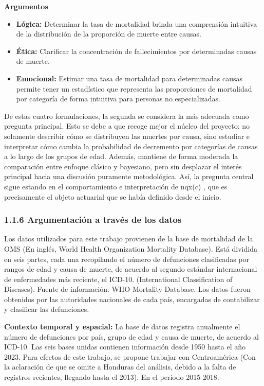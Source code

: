 \documentclass[
  letterpaper,
  DIV=11,
  numbers=noendperiod]{scrartcl}
\begin{document}
\textbf{Argumentos}

\begin{itemize}
\item
  \textbf{Lógica:} Determinar la tasa de mortalidad brinda una
  comprensión intuitiva de la distribución de la proporción de muerte
  entre causas.
\item
  \textbf{Ética:} Clarificar la concentración de fallecimientos por
  determinadas causas de muerte.
\item
  \textbf{Emocional:} Estimar una tasa de mortalidad para determinadas
  causas permite tener un estadístico que representa las proporciones de
  mortalidad por categoría de forma intuitiva para personas no
  especializadas.
\end{itemize}

De estas cuatro formulaciones, la segunda se considera la más adecuada
como pregunta principal. Esto se debe a que recoge mejor el núcleo del
proyecto: no solamente describir cómo se distribuyen las muertes por
causa, sino estudiar e interpretar cómo cambia la probabilidad de
decremento por categorías de causas a lo largo de los grupos de edad.
Además, mantiene de forma moderada la comparación entre enfoque clásico
y bayesiano, pero sin desplazar el interés principal hacia una discusión
puramente metodológica. Así, la pregunta central sigue estando en el
comportamiento e interpretación de nqx(c) , que es precisamente el
objeto actuarial que se había definido desde el inicio.

\subsubsection{1.1.6 Argumentación a través de los
datos}\label{argumentaciuxf3n-a-travuxe9s-de-los-datos}

Los datos utilizados para este trabajo provienen de la base de
mortalidad de la OMS (En inglés, World Health Organization Mortality
Database). Está dividida en seis partes, cada una recopilando el número
de defunciones clasificadas por rangos de edad y causa de muerte, de
acuerdo al segundo estándar internacional de enfermedades más reciente,
el ICD-10. (International Classification of Diseases). Fuente de
información: WHO Mortality Database. Los datos fueron obtenidos por las
autoridades nacionales de cada país, encargadas de contabilizar y
clasificar las defunciones.

\textbf{Contexto temporal y espacial:} La base de datos registra
anualmente el número de defunciones por país, grupo de edad y causa de
muerte, de acuerdo al ICD-10. Las seis bases unidas contienen
información desde 1950 hasta el año 2023. Para efectos de este trabajo,
se propone trabajar con Centroamérica (Con la aclaración de que se omite
a Honduras del análisis, debido a la falta de registros recientes,
llegando hasta el 2013). En el período 2015-2018.
\end{document}

